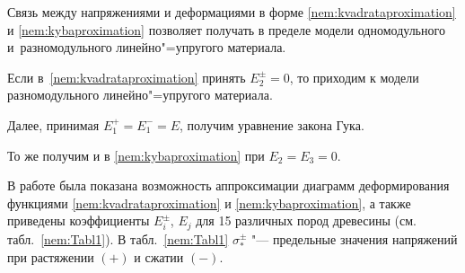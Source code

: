 Связь между напряжениями и деформациями в форме \eqref{nem:kvadrataproximation} и \eqref{nem:kybaproximation} позволяет получать в пределе модели одномодульного и~разномодульного линейно"=упругого материала. 

Если в~\eqref{nem:kvadrataproximation} принять $E^\pm_2=0$, то приходим к модели разномодульного линейно"=упругого материала. 

Далее, принимая $E^+_1=E^-_1=E$, получим уравнение закона Гука. 

То же получим и в \eqref{nem:kybaproximation} при $E_2=E_3=0$.



В работе \cite{BGTY} была показана возможность аппроксимации диаграмм деформирования функциями \eqref{nem:kvadrataproximation} и \eqref{nem:kybaproximation}, а также приведены коэффициенты $E^\pm_i$, $E_j$ для 15 различных пород древесины (см. табл.~\ref{nem:Tabl1}). В табл.~\ref{nem:Tabl1} $\sigma^\pm_*$  "---  предельные значения напряжений при растяжении $(+)$ и сжатии $(-)$. 



